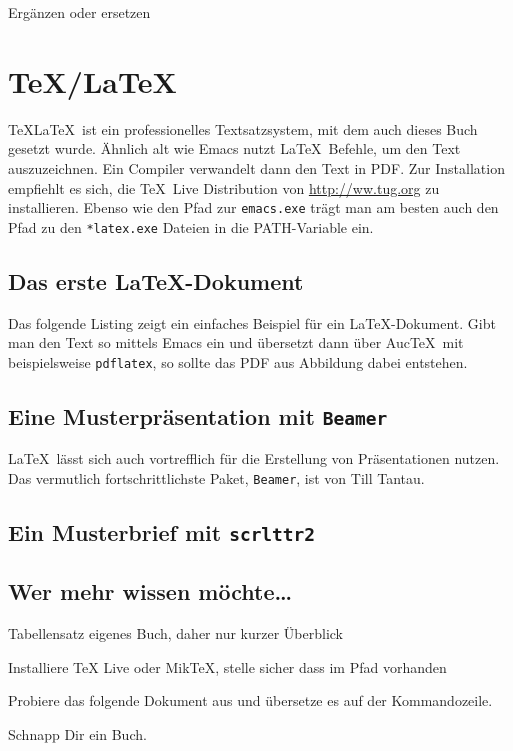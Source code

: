 \documentclass[12pt,ngerman]{scrbook}
\begin{document}
Ergänzen oder ersetzen

\section{\TeX/\LaTeX}

\TeX\LaTeX\ ist ein professionelles Textsatzsystem, mit dem auch dieses Buch gesetzt wurde. Ähnlich alt wie Emacs nutzt \LaTeX\ Befehle, um den Text auszuzeichnen. Ein Compiler verwandelt dann den Text in PDF. Zur Installation empfiehlt es sich, die \TeX\ Live Distribution von \url{http://ww.tug.org} zu installieren. Ebenso wie den Pfad zur \texttt{emacs.exe} trägt man am besten auch den Pfad zu den \texttt{*latex.exe} Dateien in die PATH-Variable ein.

\subsection{Das erste \LaTeX-Dokument}

Das folgende Listing zeigt ein einfaches Beispiel für ein \LaTeX-Dokument. Gibt man den Text so mittels Emacs ein und übersetzt dann über Auc\TeX\ mit beispielsweise \texttt{pdflatex}, so sollte das PDF aus Abbildung  dabei entstehen. 


\subsection{Eine Musterpräsentation mit \texttt{Beamer}}

\LaTeX\ lässt sich auch vortrefflich für die Erstellung von Präsentationen nutzen. Das vermutlich fortschrittlichste Paket, \texttt{Beamer}, ist von Till Tantau. 

\subsection{Ein Musterbrief mit \texttt{scrlttr2}}


\subsection{Wer mehr wissen möchte\ldots}


Tabellensatz eigenes Buch, daher nur kurzer Überblick

Installiere TeX Live oder MikTeX, stelle sicher dass im Pfad vorhanden

Probiere das folgende Dokument aus und übersetze es auf der Kommandozeile.

Schnapp Dir ein Buch.
\end{document}
